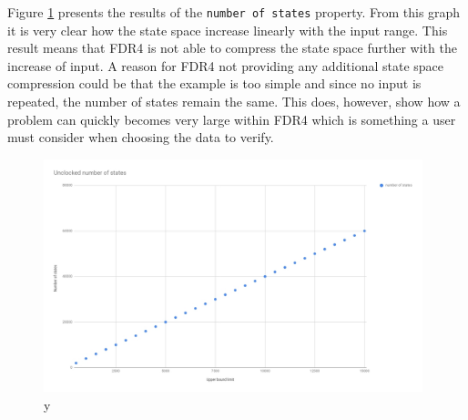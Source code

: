 Figure \ref{fig:unclocked_states} presents the results of the \texttt{number of states} property. From this graph it is very clear how the state space increase linearly with the input range. This result means that FDR4 is not able to compress the state space further with the increase of input. A reason for FDR4 not providing any additional state space compression could be that the example is too simple and since no input is repeated, the number of states remain the same. This does, however, show how a problem can quickly becomes very large within FDR4 which is something a user must consider when choosing the data to verify.
\begin{figure}
    \includegraphics[width=0.98\textwidth]{./figures/15-11-2018/unclocked_number_of_states.jpg}
\caption{y}
\label{fig:unclocked_states}
\end{figure}

